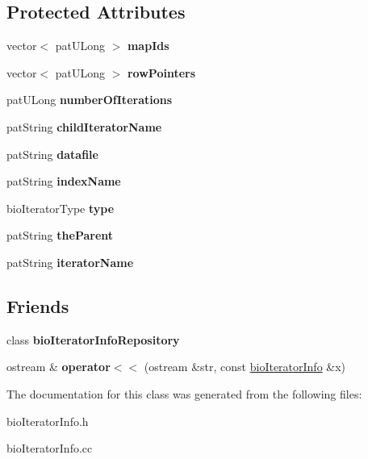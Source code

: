 \subsection*{Protected Attributes}
\begin{DoxyCompactItemize}
\item 
\mbox{\label{classbio_iterator_info_ad66329e6e576bd743afbd2823d4b1900}} 
vector$<$ pat\+U\+Long $>$ {\bfseries map\+Ids}
\item 
\mbox{\label{classbio_iterator_info_ad4af0dcaec1b50bc79683816d36103a0}} 
vector$<$ pat\+U\+Long $>$ {\bfseries row\+Pointers}
\item 
\mbox{\label{classbio_iterator_info_aa08b8f5b66daa13cb80bc3ceefc1c409}} 
pat\+U\+Long {\bfseries number\+Of\+Iterations}
\item 
\mbox{\label{classbio_iterator_info_aeb9671906450c239f9f27f606aeb8622}} 
pat\+String {\bfseries child\+Iterator\+Name}
\item 
\mbox{\label{classbio_iterator_info_ab3c9d55d15282da443f3bfdbef615878}} 
pat\+String {\bfseries datafile}
\item 
\mbox{\label{classbio_iterator_info_a402295beda0180bc7a21d87d305cff04}} 
pat\+String {\bfseries index\+Name}
\item 
\mbox{\label{classbio_iterator_info_aff295fdec2e88b7eef35e47dace534f8}} 
bio\+Iterator\+Type {\bfseries type}
\item 
\mbox{\label{classbio_iterator_info_a24451994f436313a43190d54a108aaf4}} 
pat\+String {\bfseries the\+Parent}
\item 
\mbox{\label{classbio_iterator_info_ac50a19df049f965c0a237216ac6f86fc}} 
pat\+String {\bfseries iterator\+Name}
\end{DoxyCompactItemize}
\subsection*{Friends}
\begin{DoxyCompactItemize}
\item 
\mbox{\label{classbio_iterator_info_a05ba98c8de3ef9936af42f0b230622a9}} 
class {\bfseries bio\+Iterator\+Info\+Repository}
\item 
\mbox{\label{classbio_iterator_info_a55ce11a7313175c78d71e61185f00eb9}} 
ostream \& {\bfseries operator$<$$<$} (ostream \&str, const \hyperlink{classbio_iterator_info}{bio\+Iterator\+Info} \&x)
\end{DoxyCompactItemize}


The documentation for this class was generated from the following files\+:\begin{DoxyCompactItemize}
\item 
bio\+Iterator\+Info.\+h\item 
bio\+Iterator\+Info.\+cc\end{DoxyCompactItemize}
